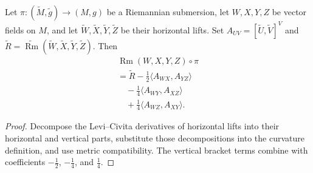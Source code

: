 \begin{proposition}
\label{prop:oneill-formula}
Let $\pi:(\widetilde M,\widetilde g)\to(M,g)$ be a Riemannian submersion,
let $W,X,Y,Z$ be vector fields on $M$, and let
$\widetilde W,\widetilde X,\widetilde Y,\widetilde Z$ be their horizontal
lifts. Set
$A_{UV}=[\widetilde U,\widetilde V]^V$ and
$\widetilde R=\widetilde{\operatorname{Rm}}(
\widetilde W,\widetilde X,\widetilde Y,\widetilde Z)$. Then
\[
\begin{gathered}
\operatorname{Rm}(W,X,Y,Z)\circ\pi\\
=\widetilde R-\frac12\langle A_{WX},A_{YZ}\rangle\\
\quad-\frac14\langle A_{WY},A_{XZ}\rangle\\
\quad+\frac14\langle A_{WZ},A_{XY}\rangle.
\end{gathered}
\]
\end{proposition}
\begin{proof}
\sketch Decompose the Levi--Civita derivatives of horizontal lifts into their
horizontal and vertical parts, substitute those decompositions into the
curvature definition, and use metric compatibility. The vertical bracket
terms combine with coefficients $-\frac12$, $-\frac14$, and $\frac14$.
\end{proof}
